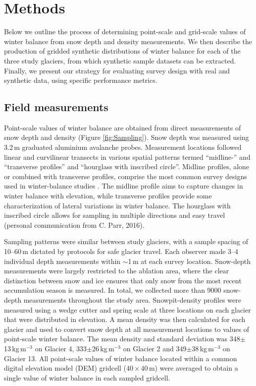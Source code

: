 \documentclass[twocolumn,letterpaper]{igs}
\begin{document}

\section{Methods}

Below we outline the process of determining point-scale and grid-scale values of winter balance from snow depth and density measurements. We then describe the production of gridded synthetic distributions of winter balance for each of the three study glaciers, from which synthetic sample datasets can be extracted. Finally, we present our strategy for evaluating survey design with real and synthetic data, using specific performance metrics. 

\subsection{Field measurements}

Point-scale values of winter balance are obtained from direct measurements of snow depth and density (Figure \ref{fig:Sampling}). Snow depth was measured using  3.2\,m graduated aluminium avalanche probes. 
Measurement locations followed linear and curvilinear transects in various spatial patterns termed ``midline-'' and ``transverse profiles'' and ``hourglass with inscribed circle''. 
Midline profiles, alone or combined with transverse profiles, comprise the most common survey designs used in winter-balance studies \citep[e.g.][]{Kaser2002, Machguth2006}. The midline profile aims to capture changes in winter balance with elevation, while transverse profiles provide some characterization of lateral variations in winter balance. The hourglass with inscribed circle allows for sampling in multiple directions and easy travel (personal communication from C. Parr, 2016). 

Sampling patterns were similar between study glaciers, with a sample spacing of 10--60\,m dictated by protocols for safe glacier travel. Each observer made 3--4 individual depth measurements within $\sim$1\,m at each survey location. Snow-depth measurements were largely restricted to the ablation area, where the clear distinction between snow and ice ensures that only snow from the most recent accumulation season is measured. In total, we collected more than 9000 snow-depth measurements throughout the study area. Snowpit-density profiles were measured using a wedge cutter and spring scale at three locations on each glacier that were distributed in elevation. A mean density was then calculated for each glacier and used to convert snow depth at all measurement locations to values of point-scale winter balance. The mean density and standard deviation was 348$\pm$13\,kg\,m$^{-3}$ on Glacier 4, 333$\pm$26\,kg\,m$^{-3}$ on Glacier 2 and 349$\pm$38\,kg\,m$^{-3}$ on Glacier 13. All point-scale values of winter balance located within a common digital elevation model (DEM) gridcell ($40\times40$\,m) were averaged to obtain a single value of winter balance in each sampled gridcell. 
\end{document}
